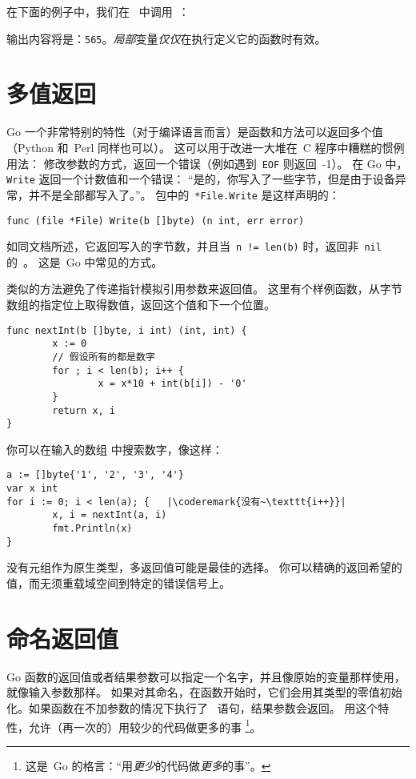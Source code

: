 在下面的例子中，我们在~ 中调用~：



输出内容将是：\texttt{565}。\emph{局部}变量\emph{仅仅}在执行定义它的函数时有效。

\section{多值返回}
\label{sec:multiple return}
Go 一个非常特别的特性（对于编译语言而言）是函数和方法可以返回多个值（Python 和~Perl 同样也可以）。
这可以用于改进一大堆在~C 程序中糟糕的惯例用法：
修改参数的方式，返回一个错误（例如遇到~\texttt{EOF} 则返回~-1）。
在 Go 中，\lstinline{Write} 返回一个计数值和一个错误：
``是的，你写入了一些字节，但是由于设备异常，并不是全部都写入了。''。
 包中的~\lstinline{*File.Write} 是这样声明的：
\begin{lstlisting}
func (file *File) Write(b []byte) (n int, err error)
\end{lstlisting}
如同文档所述，它返回写入的字节数，并且当~\lstinline{n != len(b)} 时，返回非~\lstinline{nil} 的~。
这是~Go 中常见的方式。

类似的方法避免了传递指针模拟引用参数来返回值。
这里有个样例函数，从字节数组的指定位上取得数值，返回这个值和下一个位置。
\begin{lstlisting}
func nextInt(b []byte, i int) (int, int) {
        x := 0
        // 假设所有的都是数字
        for ; i < len(b); i++ {
                x = x*10 + int(b[i]) - '0'
        }
        return x, i
}
\end{lstlisting}
你可以在输入的数组  中搜索数字，像这样：
\begin{lstlisting}
a := []byte{'1', '2', '3', '4'}
var x int
for i := 0; i < len(a); {	|\coderemark{没有~\texttt{i++}}|
        x, i = nextInt(a, i)
        fmt.Println(x)
}
\end{lstlisting}
没有元组作为原生类型，多返回值可能是最佳的选择。
你可以精确的返回希望的值，而无须重载域空间到特定的错误信号上。

\section{命名返回值}
\label{sec:named result parameters}
Go 函数的返回值或者结果参数可以指定一个名字，并且像原始的变量那样使用，就像输入参数那样。
如果对其命名，在函数开始时，它们会用其类型的零值初始化。如果函数在不加参数的情况下执行了~
 语句，结果参数会返回。
用这个特性，允许（再一次的）用较少的代码做更多的事
\footnote{这是~Go 的格言：``用\emph{更少}的代码做\emph{更多}的事''。}。

